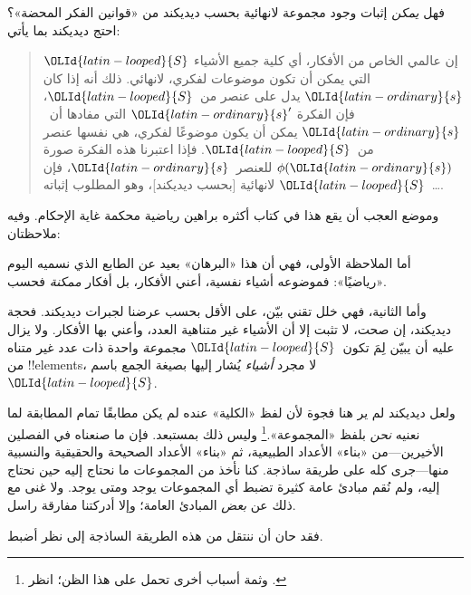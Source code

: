 \documentclass[../../../include/open-logic-section]{subfiles}
\begin{document}
فهل \emph{يمكن} إثبات وجود مجموعة لانهائية بحسب ديديكند من «قوانين الفكر المحضة»؟ احتج ديديكند بما يأتي:
\begin{quote}
  إن عالمي الخاص من الأفكار، أي كلية جميع الأشياء $\OLId{latin-looped}{S}$ التي يمكن أن
  تكون موضوعات لفكري، لانهائي. ذلك أنه إذا كان $\OLId{latin-ordinary}{s}$ يدل على عنصر
  من~$\OLId{latin-looped}{S}$، فإن الفكرة $\OLId{latin-ordinary}{s}'$ التي مفادها أن~$\OLId{latin-ordinary}{s}$ يمكن أن يكون موضوعًا
  لفكري، هي نفسها عنصر من~$\OLId{latin-looped}{S}$. فإذا اعتبرنا هذه الفكرة صورة
  $\phi(\OLId{latin-ordinary}{s})$ للعنصر~$\OLId{latin-ordinary}{s}$، فإن \dots~$\OLId{latin-looped}{S}$ لانهائية [بحسب ديديكند]، وهو
  المطلوب إثباته.
	\citep[\S66]{Dedekind1888}
\end{quote}
وموضع العجب أن يقع هذا في كتاب أكثره براهين رياضية محكمة غاية الإحكام. وفيه ملاحظتان:

أما الملاحظة الأولى، فهي أن هذا «البرهان» بعيد عن الطابع الذي نسميه اليوم «رياضيًا»: فموضوعه أشياء نفسية، أعني الأفكار، بل أفكار
\emph{ممكنة} فحسب.

وأما الثانية، فهي خلل تقني بيّن، على الأقل بحسب عرضنا لجبرات ديديكند. فحجة ديديكند، إن صحت، لا تثبت إلا أن الأشياء غير متناهية العدد، وأعني بها الأفكار. ولا يزال عليه أن يبيّن لِمَ تكون~$\OLId{latin-looped}{S}$
\emph{مجموعة} واحدة ذات عدد غير متناه من
!!{element}s، لا مجرد \emph{أشياء} يُشار إليها بصيغة الجمع باسم~$\OLId{latin-looped}{S}$.

ولعل ديديكند لم ير هنا فجوة لأن لفظ «الكلية» عنده لم يكن مطابقًا تمام المطابقة لما نعنيه \emph{نحن} بلفظ «المجموعة».\footnote{وثمة أسباب أخرى تحمل على هذا الظن؛ انظر
\citet[ص~23]{Potter2004}.} وليس ذلك بمستبعد. فإن ما صنعناه في الفصلين الأخيرين---من «بناء» الأعداد الطبيعية، ثم «بناء» الأعداد الصحيحة والحقيقية والنسبية منها---جرى كله على طريقة ساذجة. كنا نأخذ من المجموعات ما نحتاج إليه حين نحتاج إليه، ولم نُقم مبادئ عامة كثيرة تضبط أي المجموعات يوجد ومتى يوجد. ولا غنى مع ذلك عن \emph{بعض} المبادئ العامة؛ وإلا أدركتنا مفارقة راسل.

فقد حان أن ننتقل من هذه الطريقة الساذجة إلى نظر أضبط.
\end{document}
